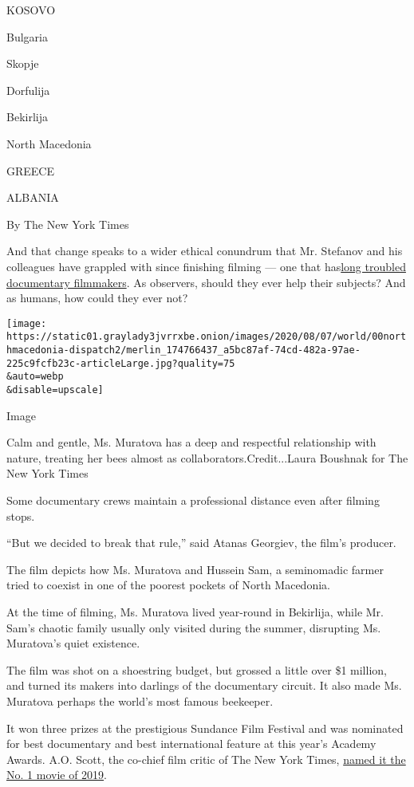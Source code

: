 KOSOVO

Bulgaria

Skopje

Dorfulija

Bekirlija

North Macedonia

GREECE

ALBANIA

By The New York Times

And that change speaks to a wider ethical conundrum that Mr. Stefanov
and his colleagues have grappled with since finishing filming --- one
that
has\href{https://www.nytimes3xbfgragh.onion/2010/11/07/movies/07lives.html}{long
troubled documentary filmmakers}. As observers, should they ever help
their subjects? And as humans, how could they ever not?

\texttt{[image: https://static01.graylady3jvrrxbe.onion/images/2020/08/07/world/00northmacedonia-dispatch2/merlin\_174766437\_a5bc87af-74cd-482a-97ae-225c9fcfb23c-articleLarge.jpg?quality=75\\\&auto=webp\\\&disable=upscale]}

Image

Calm and gentle, Ms. Muratova has a deep and respectful relationship
with nature, treating her bees almost as collaborators.Credit...Laura
Boushnak for The New York Times

Some documentary crews maintain a professional distance even after
filming stops.

``But we decided to break that rule,'' said Atanas Georgiev, the film's
producer.

The film depicts how Ms. Muratova and Hussein Sam, a seminomadic farmer
tried to coexist in one of the poorest pockets of North Macedonia.

At the time of filming, Ms. Muratova lived year-round in Bekirlija,
while Mr. Sam's chaotic family usually only visited during the summer,
disrupting Ms. Muratova's quiet existence.

The film was shot on a shoestring budget, but grossed a little over \$1
million, and turned its makers into darlings of the documentary circuit.
It also made Ms. Muratova perhaps the world's most famous beekeeper.

It won three prizes at the prestigious Sundance Film Festival and was
nominated for best documentary and best international feature at this
year's Academy Awards. A.O. Scott, the co-chief film critic of The New
York Times,
\href{https://www.nytimes3xbfgragh.onion/2019/12/04/movies/best-films.html}{named
it the No. 1 movie of 2019}.

